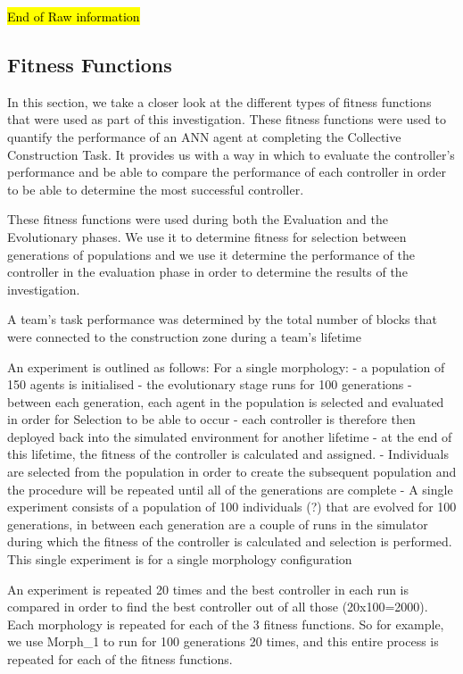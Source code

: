 \documentclass[conference]{IEEEtran}
\begin{document}
\hl{End of Raw information}

\subsection{Fitness Functions}
In this section, we take a closer look at the different types of fitness functions that were used as part of this investigation. These fitness functions were used to quantify the performance of an ANN agent at completing the Collective Construction Task.
It provides us with a way in which to evaluate the controller's performance and be able to compare the performance of each controller in order to be able to determine the most successful controller.

These fitness functions were used during both the Evaluation and the Evolutionary phases. We use it to determine fitness for selection between generations of populations and we use it determine the performance of the controller in the evaluation phase in order to determine the results of the investigation.

A team's task performance was determined by the total number of blocks that were connected to the construction zone during a team's lifetime

An experiment is outlined as follows:
For a single morphology:
	- a population of 150 agents is initialised
	- the evolutionary stage runs for 100 generations
	- between each generation, each agent in the population is selected and evaluated in order for Selection to be able to occur
		- each controller is therefore then deployed back into the simulated environment for another lifetime
		- at the end of this lifetime, the fitness of the controller is calculated and assigned.
		- Individuals are selected from the population in order to create the subsequent population and the procedure will be repeated until all of the generations are complete
	- A single experiment consists of a population of 100 individuals (?) that are evolved for 100 generations, in between each generation are a couple of runs in the simulator during which the fitness of the controller is calculated and selection is performed. This single experiment is for a single morphology configuration 
	
	An experiment is repeated 20 times and the best controller in each run is compared in order to find the best controller out of all those (20x100=2000).
	Each morphology is repeated for each of the 3 fitness functions. So for example, we use Morph_1 to run for 100 generations 20 times, and this entire process is repeated for each of the fitness functions.
	
\end{document}
